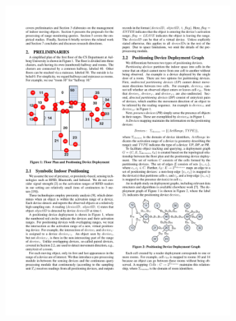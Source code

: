 \begin{frame}
\begin{columns}[c]
    \vspace{-30pt}
    \begin{figure}[tb]
      \includegraphics[width=\columnwidth]{figures/2-2/2-2-1.pdf}
    \end{figure}
    \vspace{-20pt}
    \pause
    \begin{figure}[tb]

\end{figure}
\end{columns}
\end{frame}
